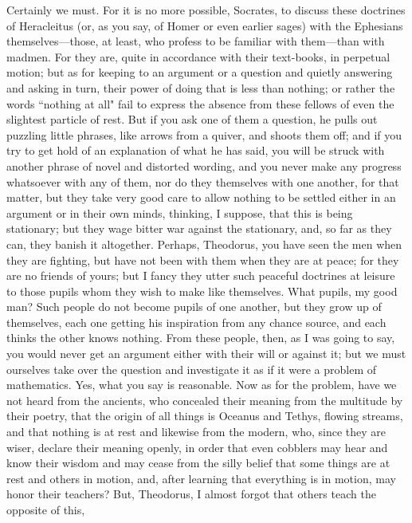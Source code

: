 \documentclass[letterpaper,12pt]{article}
\newcommand{\stephpag}[1]{\marginnote{\small\itshape\fontfamily{ppl}\selectfont #1}}
\begin{document}
\begin{drama}
Certainly we must. For it is no more possible, Socrates, to discuss these doctrines of Heracleitus (or, as you say, of Homer or even earlier sages) with the Ephesians themselves—those, at least, who profess to be familiar with them—than with madmen. For they are, quite in accordance with their text-books, in perpetual motion; but as for keeping to an argument or a question and quietly answering and asking in turn, \stephpag{180 a} their power of doing that is less than nothing; or rather the words ``nothing at all" fail to express the absence from these fellows of even the slightest particle of rest. But if you ask one of them a question, he pulls out puzzling little phrases, like arrows from a quiver, and shoots them off; and if you try to get hold of an explanation of what he has said, you will be struck with another phrase of novel and distorted wording, and you never make any progress whatsoever with any of them, nor do they themselves with one another, for that matter, \stephpag{b} but they take very good care to allow nothing to be settled either in an argument or in their own minds, thinking, I suppose, that this is being stationary; but they wage bitter war against the stationary, and, so far as they can, they banish it altogether.
\socratesspeaks
Perhaps, Theodorus, you have seen the men when they are fighting, but have not been with them when they are at peace; for they are no friends of yours; but I fancy they utter such peaceful doctrines at leisure to those pupils whom they wish to make like themselves.
\theodorusspeaks
What pupils, my good man? Such people do not become \stephpag{c} pupils of one another, but they grow up of themselves, each one getting his inspiration from any chance source, and each thinks the other knows nothing. From these people, then, as I was going to say, you would never get an argument either with their will or against it; but we must ourselves take over the question and investigate it as if it were a problem of mathematics.
\socratesspeaks
Yes, what you say is reasonable. Now as for the problem, have we not heard from the ancients, who concealed their meaning from the multitude \stephpag{d} by their poetry, that the origin of all things is Oceanus and Tethys, flowing streams, and that nothing is at rest and likewise from the modern, who, since they are wiser, declare their meaning openly, in order that even cobblers may hear and know their wisdom and may cease from the silly belief that some things are at rest and others in motion, and, after learning that everything is in motion, may honor their teachers? But, Theodorus, I almost forgot that others teach the opposite of this, \stephpag{e} 

\end{drama}
\end{document}
